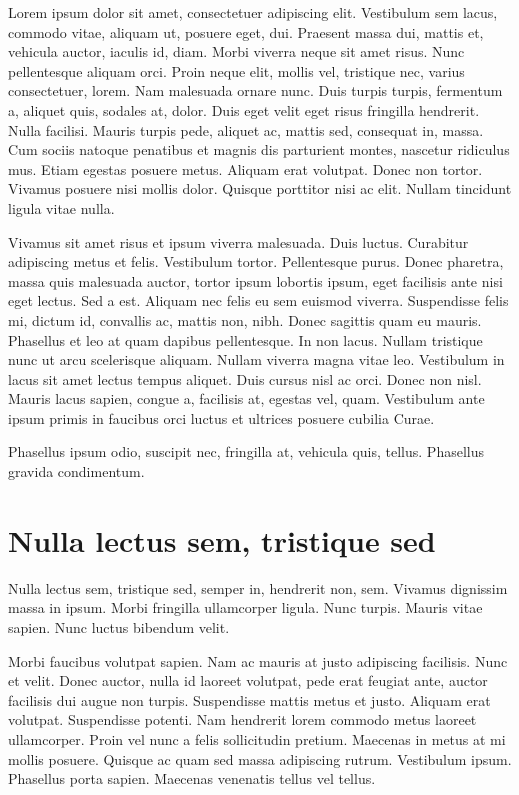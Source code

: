 \documentclass[../hdr.tex]{subfiles}
\begin{document}
Lorem ipsum dolor sit amet, consectetuer adipiscing elit. Vestibulum sem lacus,
commodo vitae, aliquam ut, posuere eget, dui. Praesent massa dui, mattis et,
vehicula auctor, iaculis id, diam. Morbi viverra neque sit amet risus. Nunc
pellentesque aliquam orci. Proin neque elit, mollis vel, tristique nec, varius
consectetuer, lorem. Nam malesuada ornare nunc. Duis turpis turpis, fermentum a,
aliquet quis, sodales at, dolor. Duis eget velit eget risus fringilla hendrerit.
Nulla facilisi. Mauris turpis pede, aliquet ac, mattis sed, consequat in, massa.
Cum sociis natoque penatibus et magnis dis parturient montes, nascetur ridiculus
mus. Etiam egestas posuere metus. Aliquam erat volutpat. Donec non tortor.
Vivamus posuere nisi mollis dolor. Quisque porttitor nisi ac elit. Nullam
tincidunt ligula vitae nulla.

Vivamus sit amet risus et ipsum viverra malesuada. Duis luctus. Curabitur
adipiscing metus et felis. Vestibulum tortor. Pellentesque purus. Donec
pharetra, massa quis malesuada auctor, tortor ipsum lobortis ipsum, eget
facilisis ante nisi eget lectus. Sed a est. Aliquam nec felis eu sem euismod
viverra. Suspendisse felis mi, dictum id, convallis ac, mattis non, nibh. Donec
sagittis quam eu mauris. Phasellus et leo at quam dapibus pellentesque. In non
lacus. Nullam tristique nunc ut arcu scelerisque aliquam. Nullam viverra magna
vitae leo. Vestibulum in lacus sit amet lectus tempus aliquet. Duis cursus nisl
ac orci. Donec non nisl. Mauris lacus sapien, congue a, facilisis at, egestas
vel, quam. Vestibulum ante ipsum primis in faucibus orci luctus et ultrices
posuere cubilia Curae.

Phasellus ipsum odio, suscipit nec, fringilla at, vehicula quis, tellus.
Phasellus gravida condimentum.

\section{Nulla lectus sem, tristique sed}

Nulla lectus sem, tristique sed, semper in, hendrerit non, sem. Vivamus
dignissim massa in ipsum. Morbi fringilla ullamcorper ligula. Nunc turpis.
Mauris vitae sapien. Nunc luctus bibendum velit.

Morbi faucibus volutpat sapien. Nam ac mauris at justo adipiscing facilisis.
Nunc et velit. Donec auctor, nulla id laoreet volutpat, pede erat feugiat ante,
auctor facilisis dui augue non turpis. Suspendisse mattis metus et justo.
Aliquam erat volutpat. Suspendisse potenti. Nam hendrerit lorem commodo metus
laoreet ullamcorper. Proin vel nunc a felis sollicitudin pretium. Maecenas in
metus at mi mollis posuere. Quisque ac quam sed massa adipiscing rutrum.
Vestibulum ipsum. Phasellus porta sapien. Maecenas venenatis tellus vel tellus.
\end{document}
